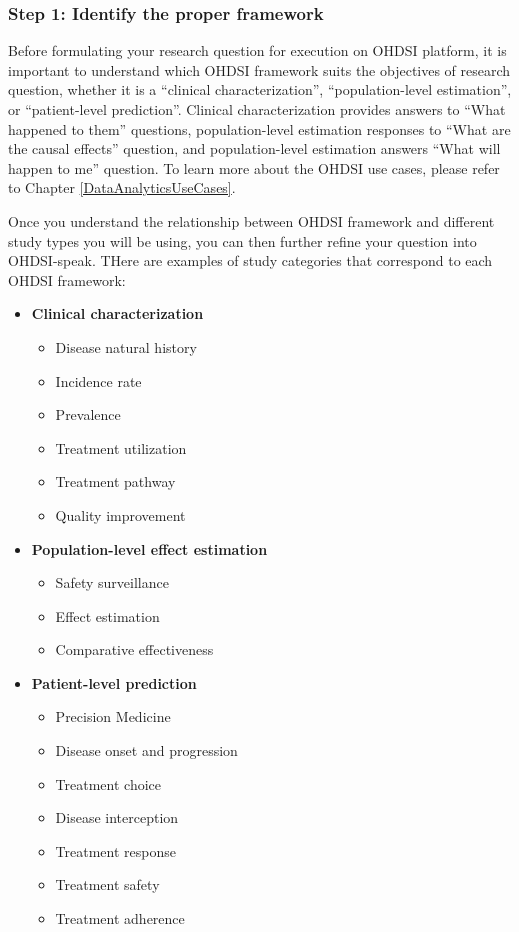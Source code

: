 \documentclass[11pt]{book}
\providecommand{\tightlist}{%
  \setlength{\itemsep}{0pt}\setlength{\parskip}{0pt}}
\theoremstyle{definition}
\theoremstyle{definition}
\theoremstyle{definition}
\theoremstyle{remark}
\begin{document}
\hypertarget{step-1-identify-the-proper-framework}{%
\subsubsection{Step 1: Identify the proper framework}\label{step-1-identify-the-proper-framework}}

Before formulating your research question for execution on OHDSI platform, it is important to understand which OHDSI framework suits the objectives of research question, whether it is a ``clinical characterization'', ``population-level estimation'', or ``patient-level prediction''. Clinical characterization provides answers to ``What happened to them'' questions, population-level estimation responses to ``What are the causal effects'' question, and population-level estimation answers ``What will happen to me'' question. To learn more about the OHDSI use cases, please refer to Chapter \ref{DataAnalyticsUseCases}.

Once you understand the relationship between OHDSI framework and different study types you will be using, you can then further refine your question into OHDSI-speak. THere are examples of study categories that correspond to each OHDSI framework:

\begin{itemize}
\tightlist
\item
  \textbf{Clinical characterization}

  \begin{itemize}
  \tightlist
  \item
    Disease natural history
  \item
    Incidence rate
  \item
    Prevalence
  \item
    Treatment utilization
  \item
    Treatment pathway
  \item
    Quality improvement
  \end{itemize}
\item
  \textbf{Population-level effect estimation}

  \begin{itemize}
  \tightlist
  \item
    Safety surveillance
  \item
    Effect estimation
  \item
    Comparative effectiveness
  \end{itemize}
\item
  \textbf{Patient-level prediction}

  \begin{itemize}
  \tightlist
  \item
    Precision Medicine
  \item
    Disease onset and progression
  \item
    Treatment choice
  \item
    Disease interception
  \item
    Treatment response
  \item
    Treatment safety
  \item
    Treatment adherence
  \end{itemize}
\end{itemize}
\end{document}
